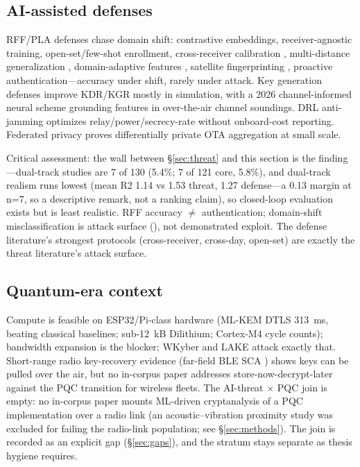 \subsection{AI-assisted defenses}
\label{sec:defense}
RFF/PLA defenses chase domain shift: contrastive embeddings, receiver-agnostic training, open-set/few-shot enrollment, cross-receiver calibration , multi-distance generalization , domain-adaptive features , satellite fingerprinting , proactive authentication---accuracy under shift, rarely under attack. Key generation defenses improve KDR/KGR mostly in simulation, with a 2026 channel-informed neural scheme  grounding features in over-the-air channel soundings. DRL anti-jamming optimizes relay/power/secrecy-rate without onboard-cost reporting. Federated privacy proves differentially private OTA aggregation at small scale.

Critical assessment: the wall between \S\ref{sec:threat} and this section is the finding---dual-track studies are 7 of 130 (5.4\%; 7 of 121 core, 5.8\%), and dual-track realism runs lowest (mean R2 1.14 vs 1.53 threat, 1.27 defense---a 0.13 margin at n=7, so a descriptive remark, not a ranking claim), so closed-loop evaluation exists but is least realistic. RFF accuracy $\ne$ authentication; domain-shift misclassification is attack surface (), not demonstrated exploit. The defense literature's strongest protocols (cross-receiver, cross-day, open-set) are exactly the threat literature's attack surface.

\subsection{Quantum-era context}
\label{sec:pqc}
Compute is feasible on ESP32/Pi-class hardware (ML-KEM DTLS 313~ms, beating classical baselines; sub-12~kB Dilithium; Cortex-M4 cycle counts); bandwidth expansion is the blocker; WKyber  and LAKE  attack exactly that. Short-range radio key-recovery evidence (far-field BLE SCA ) shows keys can be pulled over the air, but no in-corpus paper addresses store-now-decrypt-later against the PQC transition for wireless fleets. The AI-threat $\times$ PQC join is empty: no in-corpus paper mounts ML-driven cryptanalysis of a PQC implementation over a radio link (an acoustic--vibration proximity study was excluded for failing the radio-link population; see \S\ref{sec:methods}). The join is recorded as an explicit gap (\S\ref{sec:gaps}), and the stratum stays separate as thesis hygiene requires.

